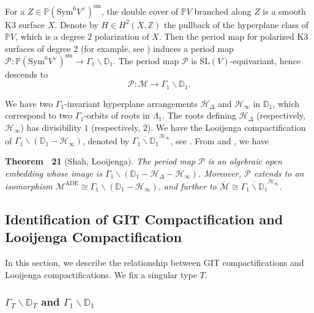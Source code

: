 \documentclass[
]{article}
\begin{document}
For a \(Z\in \mathbb{P}(\mathrm{Sym}^6 V^\vee)^{\mathrm{sm}}\), the
double cover of \(\mathbb{P} V\) branched along \(Z\) is a smooth K3
surface \(X\). Denote by \(H\in H^2(X,\mathbb{Z})\) the pullback of the
hyperplane class of \(\mathbb{P} V\), which is a degree \(2\)
polarization of \(X\). Then the period map for polarized K3 surfaces of
degree \(2\) (for example, see
\cite[Chapter 6, \S 4.1]{huybrechts2016lectures}) induces a period map
\(\mathscr{P}\colon \mathbb{P}(\mathrm{Sym}^6 V^\vee)^{\mathrm{sm}}\to \Gamma_1\backslash\mathbb{D}_1\).
The period map \(\mathscr{P}\) is \(\mathrm{SL}(V)\)-equivariant, hence
descends to
\[\mathscr{P}\colon \mathcal{M}\to \Gamma_1\backslash\mathbb{D}_1.\]

We have two \(\Gamma_1\)-invariant hyperplane arrangements
\(\mathcal{H}_\Delta\) and \(\mathcal{H}_\infty\) in \(\mathbb{D}_1\),
which correspond to two \(\Gamma_1\)-orbits of roots in \(\Lambda_1\).
The roots defining \(\mathcal{H}_\Delta\) (respectively,
\(\mathcal{H}_\infty\)) has divisibility \(1\) (respectively, \(2\)). We
have the Looijenga compactification of
\(\Gamma_1\backslash(\mathbb{D}_1-\mathcal{H}_\infty)\), denoted by
\(\overline{\Gamma_1\backslash\mathbb{D}_1}^{\mathcal{H}_\infty}\), see
\cite{looijenga2003compactificationsII}. From \cite{shah1980complete}
and \cite{looijenga2003compactificationsII}, we have

\textbf{Theorem~ 21} (Shah, Looijenga).
\emph{\label{thm: Shah--Looijenga} The period map \(\mathscr{P}\) is an
algebraic open embedding whose image is
\(\Gamma_1\backslash(\mathbb{D}_1-\mathcal{H}_\Delta-\mathcal{H}_\infty)\).
Moreover, \(\mathscr{P}\) extends to an isomorphism
\(\mathcal{M}^{\mathrm{ADE}}\cong\Gamma_1\backslash(\mathbb{D}_1-\mathcal{H}_\infty)\),
and further to
\(\overline{\mathcal{M}}\cong\overline{\Gamma_1\backslash\mathbb{D}_1}^{\mathcal{H}_\infty}\).}

\subsection{Identification of GIT Compactification and Looijenga
Compactification}\label{subsec:ux20identificationux20ofux20compactifications}

In this section, we describe the relationship between GIT
compactifications and Looijenga compactifications. We fix a singular
type \(T\).

\subsubsection{\texorpdfstring{\(\Gamma_T\backslash\mathbb{D}_T\) and
\(\Gamma_1\backslash\mathbb{D}_1\)}{\textbackslash Gamma\_T\textbackslash backslash\textbackslash mathbb\{D\}\_T and \textbackslash Gamma\_1\textbackslash backslash\textbackslash mathbb\{D\}\_1}}\label{gamma_tbackslashmathbbd_t-and-gamma_1backslashmathbbd_1}
\end{document}
